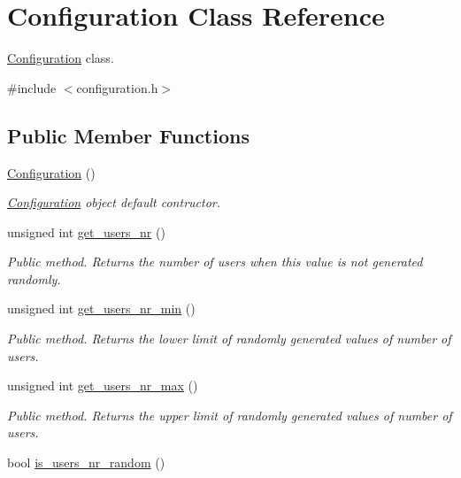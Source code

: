 \hypertarget{classConfiguration}{}\section{Configuration Class Reference}
\label{classConfiguration}


\hyperlink{classConfiguration}{Configuration} class.  




{\ttfamily \#include $<$configuration.\+h$>$}

\subsection*{Public Member Functions}
\begin{DoxyCompactItemize}
\item 
\hyperlink{classConfiguration_a779947337bf652f0e773cb29f37f14ba}{Configuration} ()
\begin{DoxyCompactList}\small\item\em \hyperlink{classConfiguration}{Configuration} object default contructor. \end{DoxyCompactList}\item 
unsigned int \hyperlink{classConfiguration_ace5f9aa5555419110b7df4e6eb664931}{get\+\_\+users\+\_\+nr} ()
\begin{DoxyCompactList}\small\item\em Public method. Returns the number of users when this value is not generated randomly. \end{DoxyCompactList}\item 
unsigned int \hyperlink{classConfiguration_a09999edf2be5ece81d64ea825c7fd339}{get\+\_\+users\+\_\+nr\+\_\+min} ()
\begin{DoxyCompactList}\small\item\em Public method. Returns the lower limit of randomly generated values of number of users. \end{DoxyCompactList}\item 
unsigned int \hyperlink{classConfiguration_a2ce1f2af9f9733712a8cbbfb7f5b277c}{get\+\_\+users\+\_\+nr\+\_\+max} ()
\begin{DoxyCompactList}\small\item\em Public method. Returns the upper limit of randomly generated values of number of users. \end{DoxyCompactList}\item 
bool \hyperlink{classConfiguration_a3c6d60da873c53d2a785e64f67668c4f}{is\+\_\+users\+\_\+nr\+\_\+random} ()

\end{DoxyCompactItemize}
